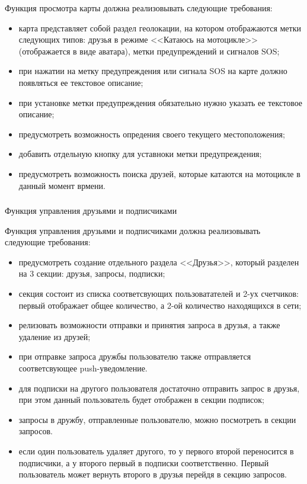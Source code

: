 Функция просмотра карты должна реализовывать следующие требования:
\begin{itemize}
	\item карта представляет собой раздел геолокации, на котором отображаются метки следующих типов: друзья в режиме <<Катаюсь на мотоцикле>> (отображается в виде аватара), метки предупреждений и сигналов SOS;
	\item при нажатии на метку предупреждения или сигнала SOS на карте должно появляться ее текстовое описание;
	\item при установке метки предупреждения обязательно нужно указать ее текстовое описание;
	\item предусмотреть возможность опредения своего текущего местоположения;
	\item добавить отдельную кнопку для уставноки метки предупреждения;
	\item предусмотреть возможность поиска друзей, которые катаются на мотоцикле в данный момент врмени.
\end{itemize}

\subsubsection{} Функция управления друзьями и подписчиками
\label{sec:domain:specification:student_history}

Функция управления друзьями и подписчиками должна реализовывать следующие требования:
\begin{itemize}
	\item предусмотреть создание отдельного раздела <<Друзья>>, который разделен на 3 секции: друзья, запросы, подписки;
	\item секция состоит из списка соответсвующих пользоватателей и 2-ух счетчиков: первый отображает общее количество, а 2-ой количество находящихся в сети;
	\item релизовать возможности отправки и принятия запроса в друзья, а также удаление из друзей;
	\item при отправке запроса дружбы пользователю также отправляется соответсвующее push-уведомление.
	\item для подписки на другого пользователя достаточно отправить запрос в друзья, при этом данный пользователь будет отображен в секции подписок;
	\item запросы в дружбу, отправленные пользователю, можно посмотреть в секции запросов.
	\item если один пользователь удаляет другого, то у первого второй переносится в подписчики, а у второго первый в подписки соответственно. Первый пользователь может вернуть второго в друзья перейдя в секцию запросов.
\end{itemize}











